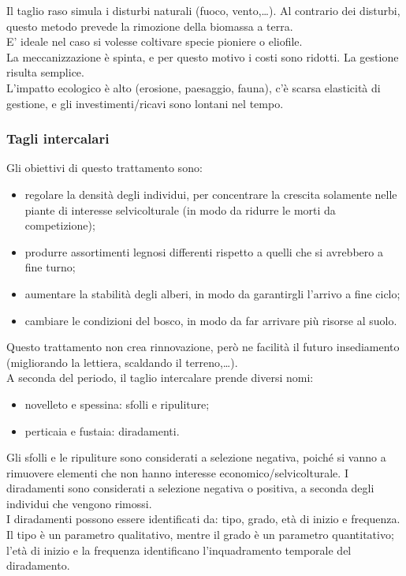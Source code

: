 \documentclass{article}
\begin{document}
Il taglio raso simula i disturbi naturali (fuoco, vento,\dots). Al contrario dei disturbi, questo metodo prevede la rimozione della biomassa a terra.\\
E' ideale nel caso si volesse coltivare specie pioniere o eliofile.\\
La meccanizzazione è spinta, e per questo motivo i costi sono ridotti. La gestione risulta semplice.\\
L'impatto ecologico è alto (erosione, paesaggio, fauna), c'è scarsa elasticità di gestione, e gli investimenti/ricavi sono lontani nel tempo.
\subsubsection{Tagli intercalari}
Gli obiettivi di questo trattamento sono:
\begin{itemize}
    \item regolare la densità degli individui, per concentrare la crescita solamente nelle piante di interesse selvicolturale (in modo da ridurre le morti da competizione);
    \item produrre assortimenti legnosi differenti rispetto a quelli che si avrebbero a fine turno;
    \item aumentare la stabilità degli alberi, in modo da garantirgli l'arrivo a fine ciclo;
    \item cambiare le condizioni del bosco, in modo da far arrivare più risorse al suolo.
\end{itemize}
Questo trattamento non crea rinnovazione, però ne facilità il futuro insediamento (migliorando la lettiera, scaldando il terreno,\dots).\\
A seconda del periodo, il taglio intercalare prende diversi nomi:
\begin{itemize}
    \item novelleto e spessina: sfolli e ripuliture;
    \item perticaia e fustaia: diradamenti.
\end{itemize}
Gli sfolli e le ripuliture sono considerati a selezione negativa, poiché si vanno a rimuovere elementi che non hanno interesse economico/selvicolturale. I diradamenti sono considerati a selezione negativa o positiva, a seconda degli individui che vengono rimossi.\\
I diradamenti possono essere identificati da: tipo, grado, età di inizio e frequenza. Il tipo è un parametro qualitativo, mentre il grado è un parametro quantitativo; l'età di inizio e la frequenza identificano l'inquadramento temporale del diradamento.\\
\end{document}
